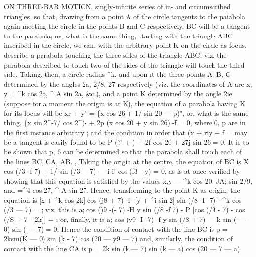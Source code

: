 \documentclass[12pt,a4paper]{article}
\begin{document}
ON THREE-BAR MOTION.
singly-infinite
series
of
in-
and
circumscribed
triangles,
so
that,
drawing from
a
point
A
of
the
circle
tangents
to
the
paiabola
again
meeting
the
circle
in
the
points B
and C
respectively, BC
will
be
a
tangent
to
the
parabola;
or,
what
is
the
same
thing,
starting
with
the
triangle ABC
inscribed
in
the
circle,
we
can,
with
the
arbitrary
point K
on
the
circle
as
focus,
describe
a
parabola
touching
the
three
sides
of
the
triangle ABC;
viz.
the
parabola
described
to
touch
two
of
the
sides
of
the
triangle
will touch the third
side.
Taking, then, a
circle
radius
\textasciicircum{}k, and upon
it
the
three
points A, B, C determined
by
the
angles
2a,
2/8,
27
respectively
(viz.
the
coordinates
of A
are
x, y = \textasciicircum{}k cos 2o,
\textasciicircum{} A sin 2a,
\&c.),
and
a
point K
determined
by
the
angle
2ie
(suppose
for
a moment
the origin
is at K), the equation
of a parabola having K
for
its
focus
will be
xr + y" = \{x cos 26 + 1/ sin 20 --- p)",
or, what
is the same thing,
\{x sin 2\textasciicircum{}-7/ cos 2\textasciicircum{})- + 2p (x cos 20 + y sin 26) -f = 0,
where
0, p
are
in
the
first
instance
arbitrary
;
and
the
condition
in
order
that
(x + riy + f =
may be a tangent
is
easily found
to be
P (?' + \textyen{}) + 2f cos 20 + 27j sin 26 = 0.
It
is
to
be
shown
that
p,
6
can
be
determined
so
that
the
parabola
shall
touch
each
of the
lines BC, CA, AB.
,
Taking
the
origin
at
the
centre,
the
equation
of BC
is
X cos (/3 -f 7) + 1/ sin (/3 + 7) --- i i' cos (f3---y) = 0,
as
is at once
verified by showing that
this equation
is
satisfied by the values
x,y --- \textasciicircum{}k cos 20,
JA; sin 2/9,
and =\textasciicircum{}4 cos 27,
\textasciicircum{} A sin 27.
Hence,
transforming
to
the
point K
as
origin, the
equation
is
[x + \textasciicircum{}k cos 2k] cos (j8 + 7) -I- [y + \textasciicircum{}i sin 2\guillemotleft{}] sin (/8
-I- 7) - \textasciicircum{}k cos (/3 --- 7) =
;
viz.
this
is
a; cos ()9
-(- 7) -H y sin (/8 -f 7) - P [cos (/9 - 7) - cos (/S + 7 - 2k)] =
;
or,
finally,
it
is
a; cos (y9 -I- 7) -f y sin (/8 + 7) --- k sin (\guillemotleft{} --- 0) sin (\guillemotleft{} --- 7) = 0.
Hence the condition of contact
with
the
line BC
is
p = 2ksm(K --- 0) sin (k - 7) cos (20 --- y9 --- 7)
and,
similarly,
the condition
of contact
with
the
line CA
is
p = 2k sin (k --- 7) sin (k --- a) cos (20 --- 7 --- a)
\end{document}
